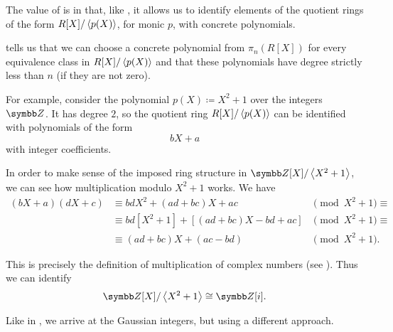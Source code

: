 \begin{example}\label{ex:polynomial_quotient_rings_gaussian_integers}
  The value of  is in that, like , it allows us to identify elements of the quotient rings of the form \( R[X] / \left\langle p(X) \right\rangle \), for monic \( p \), with concrete polynomials.

   tells us that we can choose a concrete polynomial from \( \pi_n(R[X]) \) for every equivalence class in \( R[X] / \left\langle p(X) \right\rangle \) and that these polynomials have degree strictly less than \( n \) (if they are not zero).

  For example, consider the polynomial \( p(X) \coloneqq X^2 + 1 \) over the integers \( \BZ \). It has degree \( 2 \), so the quotient ring \( R[X] / \left\langle p(X) \right\rangle \) can be identified with polynomials of the form
  \begin{equation}\label{ex:polynomial_quotient_rings_gaussian_integers/linear_polynomial}
    bX + a
  \end{equation}
  with integer coefficients.

  In order to make sense of the imposed ring structure in \( \BZ[X] / \Gen{X^2 + 1} \), we can see how multiplication modulo \( X^2 + 1 \) works. We have
  \begin{align*}
    (bX + a) (dX + c)
    &\equiv
    bdX^2 + (ad + bc)X + ac
    &\pmod {X^2 + 1} \equiv \\ &\equiv
    bd[X^2 + 1] + [(ad + bc)X - bd + ac]
    &\pmod {X^2 + 1} \equiv \\ &\equiv
    (ad + bc)X + (ac - bd)
    &\pmod {X^2 + 1}. \phantom{\equiv}
  \end{align*}

  This is precisely the definition of multiplication of complex numbers (see ). Thus we can identify
  \begin{equation*}
    \BZ[X] / \Gen{X^2 + 1} \cong \BZ[i].
  \end{equation*}

  Like in , we arrive at the Gaussian integers, but using a different approach.
\end{example}


